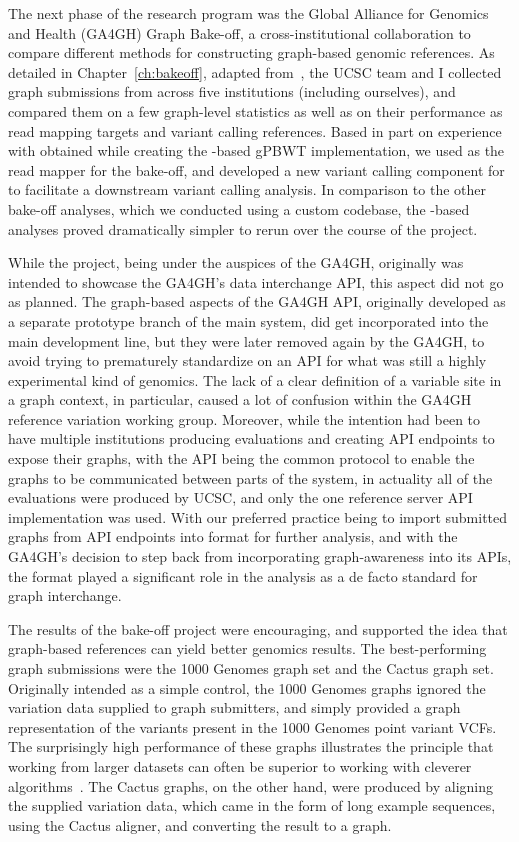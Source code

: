 The next phase of the research program was the Global Alliance for Genomics and Health (GA4GH) Graph Bake-off, a cross-institutional collaboration to compare different methods for constructing graph-based genomic references. As detailed in Chapter~\ref{ch:bakeoff}, adapted from~\citet{novak2017genome}, the UCSC team and I collected graph submissions from across five institutions (including ourselves), and compared them on a few graph-level statistics as well as on their performance as read mapping targets and variant calling references. Based in part on experience with \vg obtained while creating the \vg-based gPBWT implementation, we used \vg as the read mapper for the bake-off, and developed a new variant calling component for \vg to facilitate a downstream variant calling analysis. In comparison to the other bake-off analyses, which we conducted using a custom codebase, the \vg-based analyses proved dramatically simpler to rerun over the course of the project.

While the project, being under the auspices of the GA4GH, originally was intended to showcase the GA4GH's data interchange API, this aspect did not go as planned. The graph-based aspects of the GA4GH API, originally developed as a separate prototype branch of the main system, did get incorporated into the main development line, but they were later removed again by the GA4GH, to avoid trying to prematurely  standardize on an API for what was still a highly experimental kind of genomics. The lack of a clear definition of a variable site in a graph context, in particular, caused a lot of confusion within the GA4GH reference variation working group. Moreover, while the intention had been to have multiple institutions producing evaluations and creating API endpoints to expose their graphs, with the API being the common protocol to enable the graphs to be communicated between parts of the system, in actuality all of the evaluations were produced by UCSC, and only the one reference server API implementation was used. With our preferred practice being to import submitted graphs from API endpoints into \vg format for further analysis, and with the GA4GH's decision to step back from incorporating graph-awareness into its APIs, the \vg format played a significant role in the analysis as a de facto standard for graph interchange.

The results of the bake-off project were encouraging, and supported the idea that graph-based references can yield better genomics results. The best-performing graph submissions were the 1000 Genomes graph set and the Cactus graph set. Originally intended as a simple control, the 1000 Genomes graphs ignored the variation data supplied to graph submitters, and simply provided a graph representation of the variants present in the 1000 Genomes point variant VCFs. The surprisingly high performance of these graphs illustrates the principle that working from larger datasets can often be superior to working with cleverer algorithms~\cite{halevy2009unreasonable}. The Cactus graphs, on the other hand, were produced by aligning the supplied variation data, which came in the form of long example sequences, using the Cactus aligner, and converting the result to a graph.

